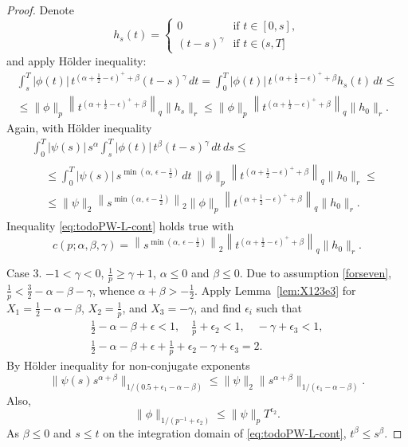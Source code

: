 \documentclass{article}
\theoremstyle{plain}
\theoremstyle{remark}
\theoremstyle{definition}
\begin{document}
\begin{proof}
	Denote
	\[
		h_s(t) = \begin{cases}
			0 & \mbox{if $t\in[0,s]$}, \\
			(t-s)^\gamma & \mbox{if $t\in(s,T]$}
		\end{cases}
	\]
	and apply H\"older inequality:
	\begin{gather*}
		\int_s^T |\phi(t)|\,
		t^{\left(\alpha+\frac12-\epsilon\right)^+ + \beta}
		(t-s)^\gamma
		\, dt=
		\int_0^T |\phi(t)|\,
		t^{\left(\alpha+\frac12-\epsilon\right)^+ + \beta}
		h_s(t)
		\, dt
		\le \\ \le
		 \|\phi\|_p
		\left\|t^{\left(\alpha+\frac12-\epsilon\right)^+ + \beta}\right\|_q
		\|h_s\|_r
		 \le
		\|\phi\|_p
		\left\|t^{\left(\alpha+\frac12-\epsilon\right)^+ + \beta}\right\|_q
		\|h_0\|_r .
	\end{gather*}
	Again, with H\"older inequality
	\begin{multline*}
		\int_0^T |\psi(s)|\, s^\alpha
		\int_s^T |\phi(t)|\, t^\beta (t-s)^\gamma
		\, dt \, ds
		\le \\
		\begin{aligned}
			&\le
			\int_0^T |\psi(s)|\,
			s^{\min\left(\alpha,\, \epsilon-\frac12\right)}
			\, dt \,
			\|\phi\|_p
			\left\|t^{\left(\alpha+\frac12-\epsilon\right)^+
				+ \beta}\right\|_q
			\|h_0\|_r
			\le \\ &\le
			\|\psi\|_2
			\left\|s^{\min\left(\alpha,\, \epsilon-\frac12\right)}\right\|_2
			\|\phi\|_p
			\left\|t^{\left(\alpha+\frac12-\epsilon\right)^+
				+ \beta}\right\|_q
			\|h_0\|_r .
		\end{aligned}
	\end{multline*}
	Inequality \eqref{eq:todoPW-L-cont} holds true with
	\begin{equation*}
		c(p; \alpha, \beta, \gamma) =
		\left\|s^{\min\left(\alpha,\, \epsilon-\frac12\right)}\right\|_2
		\left\|t^{\left(\alpha+\frac12-\epsilon\right)^+ + \beta}\right\|_q
		\|h_0\|_r .
	\end{equation*}

Case 3.
$-1<\gamma<0$, $\frac{1}{p}\ge \gamma+1$,
$\alpha\le0$ and $\beta\le 0$.
Due to assumption
\eqref{forseven},
$\frac{1}{p} < \frac32 - \alpha-\beta-\gamma$,
whence $\alpha+\beta>-\frac12$.
Apply Lemma~\ref{lem:X123e3}
for $X_1 = \frac12-\alpha-\beta$,
$X_2 = \frac{1}{p}$,
and
$X_3 =  -\gamma$, and find $\epsilon_i$
such that
\begin{gather*}
\frac12 - \alpha - \beta + \epsilon < 1,
\quad
\frac1p + \epsilon_2 < 1,
\quad
-\gamma + \epsilon_3 < 1, \\
\frac12 - \alpha - \beta + \epsilon +
\frac1p + \epsilon_2
-\gamma + \epsilon_3 = 2.
\end{gather*}
By H\"older inequality for non-conjugate
exponents
\[
  \|\psi(s) s^{\alpha+\beta}\|_
{1/(0.5+\epsilon_1-\alpha-\beta)}
\le
\|\psi\|_2
\|s^{\alpha+\beta}\|_{1/(\epsilon_1-\alpha-\beta)}.
\]
Also,
\[
\|\phi\|_{1/(p^{-1} + \epsilon_2)}
\le
\|\psi\|_p T^{\epsilon_2} .
\]
As $\beta\le 0$
and $s\le t$ on the integration domain
of \eqref{eq:todoPW-L-cont},
$t^\beta \le s^\beta$.


\end{proof}
\end{document}
